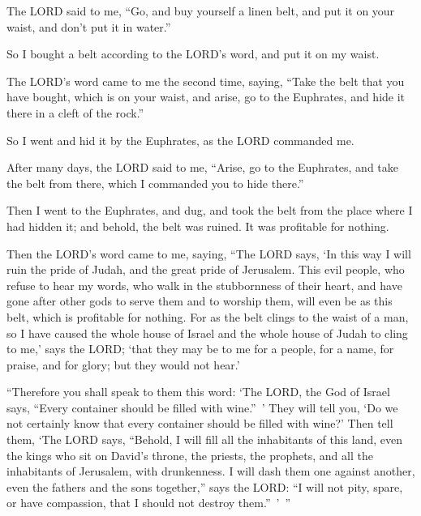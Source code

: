 \mychapter{}\myverse*{}The LORD said to me, “Go, and buy yourself a linen belt, and put it on your waist, and don’t put it in water.”

\quad\quad \myverse{}So I bought a belt according to the LORD’s word, and put it on
my waist.


\myverse{}The LORD’s word came to me the second time, saying, \myverse{}“Take the belt that you have bought, which is on your waist, and arise, go to the Euphrates, and hide it there in a cleft of the rock.”


\myverse{}So I went and hid it by the Euphrates, as the LORD commanded me.


\myverse{}After many days, the LORD said to me, “Arise, go to the Euphrates,
and take the belt from there, which I commanded you to hide there.”


\myverse{}Then I went to the Euphrates, and dug, and took the belt from
the place where I had hidden it; and behold, the belt was ruined. It was profitable for nothing.


\myverse{}Then the LORD’s word came to me, saying, \myverse{}“The LORD says, ‘In this way I will ruin the pride of Judah, and the great pride of Jerusalem. \myverse{}This evil people, who refuse to hear my words, who walk in the stubbornness of their heart, and have gone after other gods to serve them and to worship them, will even be as this belt, which is profitable for nothing. \myverse{}For as the belt clings to the waist of a man, so I have caused the whole house of Israel and the whole house of Judah to cling to me,’ says the LORD; ‘that they may be to me for a people, for a name, for praise, and for glory; but they would not hear.’


\myverse{}“Therefore you shall speak to them this word: ‘The LORD, the God of Israel says, “Every container should be filled with wine.” ’ They will tell you, ‘Do we not certainly know that every container should be filled with wine?’ \myverse{}Then tell them, ‘The LORD says, “Behold, I will fill all the inhabitants of this land, even the kings who sit on David’s throne, the priests, the prophets, and all the inhabitants of Jerusalem, with drunkenness. \myverse{}I will dash them one against another, even the fathers and the sons together,” says the LORD: “I will not pity, spare, or have compassion, that I should not destroy them.” ’ ”


